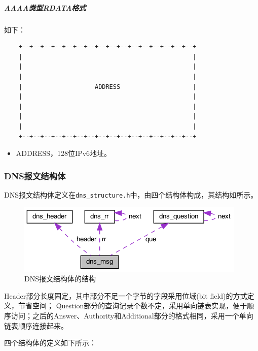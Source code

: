 \documentclass[lang=cn,11pt,a4paper,cite=authornum]{paper}
\begin{document}
\subparagraph{AAAA类型RDATA格式}

如下：

\begin{code}
\begin{verbatim}
    +--+--+--+--+--+--+--+--+--+--+--+--+--+--+--+--+
    |                                               |
    |                                               |
    |                                               |
    |                    ADDRESS                    |
    |                                               |
    |                                               |
    |                                               |
    |                                               |
    +--+--+--+--+--+--+--+--+--+--+--+--+--+--+--+--+
\end{verbatim}
\end{code}

\begin{itemize}
    \item ADDRESS，128位IPv6地址。
\end{itemize}

\subsubsection{DNS报文结构体}

DNS报文结构体定义在\texttt{dns_structure.h}中，由四个结构体构成，其结构如所示。

\begin{figure}[htbp]

    \centering
    \includegraphics[width=0.7\linewidth]{./APIdoc/structdns__msg__coll__graph.png}
    \caption{DNS报文结构体的结构\label{fig:struct_structure}}

\end{figure}

Header部分长度固定，其中部分不足一个字节的字段采用位域(bit field)的方式定义，节省空间；
Question部分的查询记录个数不定，采用单向链表实现，便于顺序访问；之后的Answer、Authority和Additional部分的格式相同，采用一个单向链表顺序连接起来。

四个结构体的定义如下所示：
\end{document}
